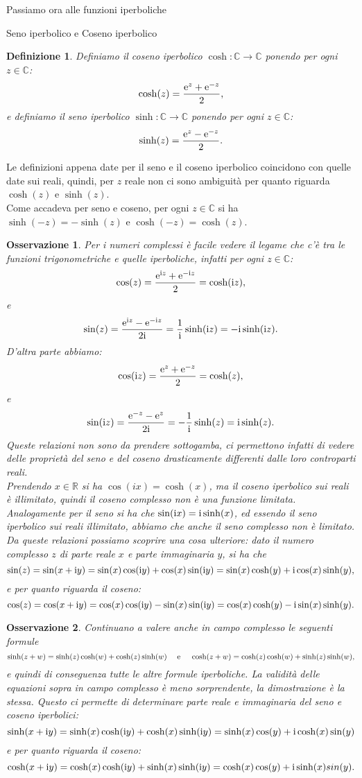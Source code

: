 \documentclass[11pt]{book}
\theoremstyle{Definizione}
\newtheorem*{mydef}{Definizione}
\theoremstyle{TeoremaProposizioneLemmaCorollarioCongettura}
\theoremstyle{OsservazioneNotaEsempio}
\newtheorem{myobs}{Osservazione}[section]
\newcommand{\R}{\mathbb{R}}
\newcommand{\C}{\mathbb{C}}
\renewcommand{\i}{\textup{i}}
\newcommand{\e}{\textup{e}}
\begin{document}
Passiamo ora alle funzioni iperboliche
\begin{boxdef}{Seno iperbolico e Coseno iperbolico}
\begin{mydef}
Definiamo il coseno iperbolico $\cosh:\C\longrightarrow \C$ ponendo per ogni $z\in \C$:
$$
\cosh(z) = \frac{\e^z+\e^{-z}}{2},
$$
e definiamo il seno iperbolico $\sinh:\C\longrightarrow \C$ ponendo per ogni $z\in \C$:
$$
\sinh(z) = \frac{\e^{z}-\e^{-z}}{2}.
$$
\end{mydef}
\end{boxdef}
\noindent
Le definizioni appena date per il seno e il coseno iperbolico coincidono con quelle date sui reali, quindi, per $z$ reale non ci sono ambiguità per quanto riguarda $\cosh(z)$ e $\sinh(z)$.\\
Come accadeva per seno e coseno, per ogni $z\in \C$ si ha $\sinh(-z) =-\sinh(z)$ e $\cosh(-z) = \cosh(z)$.
\begin{myobs}
Per i numeri complessi è facile vedere il legame che c'è tra le funzioni trigonometriche e quelle iperboliche, infatti per ogni $z\in \C$:
$$
\cos(z) = \frac{\e^{\i z}+\e^{-\i z}}{2} = \cosh(\i z),
$$
e
$$
\sin(z) = \frac{\e^{\i z}-\e^{-\i z}}{2\i} = \frac{1}{\i}\sinh(\i z) = -\i\sinh(\i z).
$$
D'altra parte abbiamo:
$$
\cos(\i z) = \frac{\e^{z}+\e^{-z}}{2} = \cosh(z),
$$
e
$$
\sin(\i z) = \frac{\e^{-z}-\e^{z}}{2\i} = -\frac{1}{\i}\sinh(z) = \i\sinh(z).
$$
Queste relazioni non sono da prendere sottogamba, ci permettono infatti di vedere delle proprietà del seno e del coseno drasticamente differenti dalle loro controparti reali.\\
Prendendo $x\in \R$ si ha $\cos(ix) = \cosh(x)$, ma il coseno iperbolico sui reali è illimitato, quindi il coseno complesso non è una funzione limitata. Analogamente per il seno si ha che $\sin(\i x) = \i\sinh(x)$, ed essendo il seno iperbolico sui reali illimitato, abbiamo che anche il seno complesso non è limitato.\\
Da queste relazioni possiamo scoprire una cosa ulteriore: dato il numero complesso $z$ di parte reale $x$ e parte immaginaria $y$, si ha che
$$
\sin(z) = \sin(x+\i y) = \sin(x)\cos(\i y)+\cos(x)\sin(\i y) = \sin(x)\cosh(y) + \i\cos(x)\sinh(y),
$$
e per quanto riguarda il coseno:
$$
\cos(z) = \cos(x+\i y) = \cos(x)\cos(\i y)-\sin(x)\sin(\i y) = \cos(x)\cosh(y)-\i\sin(x)\sinh(y).
$$
\end{myobs}
\begin{myobs}
Continuano a valere anche in campo complesso le seguenti formule
$$
\sinh(z+w) = \sinh(z)\cosh(w)+\cosh(z)\sinh(w)\quad \textup{ e }\quad \cosh(z+w) = \cosh(z)\cosh(w)+\sinh(z)\sinh(w),
$$
e quindi di conseguenza tutte le altre formule iperboliche. La validità delle equazioni sopra in campo complesso è meno sorprendente, la dimostrazione è la stessa.
Questo ci permette di determinare parte reale e immaginaria del seno e coseno iperbolici:
$$
\sinh(x+\i y) = \sinh(x)\cosh(\i y) + \cosh(x)\sinh(\i y) = \sinh(x)\cos(y) +\i \cosh(x)\sin(y)
$$
e per quanto riguarda il coseno:
$$
\cosh(x+\i y) = \cosh(x)\cosh(\i y) + \sinh(x)\sinh(\i y) = \cosh(x)\cos(y) + \i \sinh(x)sin(y).
$$
\end{myobs}
\end{document}
